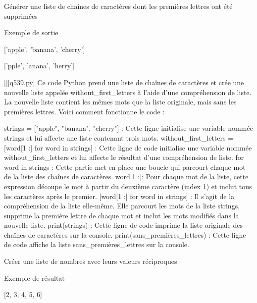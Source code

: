         \question
        Générer une liste de chaînes de caractères dont les premières lettres ont été supprimées

Exemple de sortie

['apple', 'banana', 'cherry']

['pple', 'anana', 'herry']
        \par
        \begin{solution}
            \renewcommand{\nomfichier}{q539.py}
            \pythonfile{\chemincode \nomfichier}[][\nomfichier]
            Ce code Python prend une liste de chaînes de caractères et crée une nouvelle liste appelée without_first_letters à l'aide d'une compréhension de liste. La nouvelle liste contient les mêmes mots que la liste originale, mais sans les premières lettres. Voici comment fonctionne le code :

    strings = ["apple", "banana", "cherry"] : Cette ligne initialise une variable nommée strings et lui affecte une liste contenant trois mots.
    without_first_letters = [word[1 :] for word in strings] : Cette ligne de code initialise une variable nommée without_first_letters et lui affecte le résultat d'une compréhension de liste.
        for word in strings : Cette partie met en place une boucle qui parcourt chaque mot de la liste des chaînes de caractères.
        word[1 :]: Pour chaque mot de la liste, cette expression découpe le mot à partir du deuxième caractère (index 1) et inclut tous les caractères après le premier.
        [word[1 :] for word in strings] : Il s'agit de la compréhension de la liste elle-même. Elle parcourt les mots de la liste strings, supprime la première lettre de chaque mot et inclut les mots modifiés dans la nouvelle liste.
    print(strings) : Cette ligne de code imprime la liste originale des chaînes de caractères sur la console.
    print(sans_premières_lettres) : Cette ligne de code affiche la liste sans_premières_lettres sur la console.
        \end{solution}
        

        \question
        Créer une liste de nombres avec leurs valeurs réciproques

Exemple de résultat

[2, 3, 4, 5, 6]

